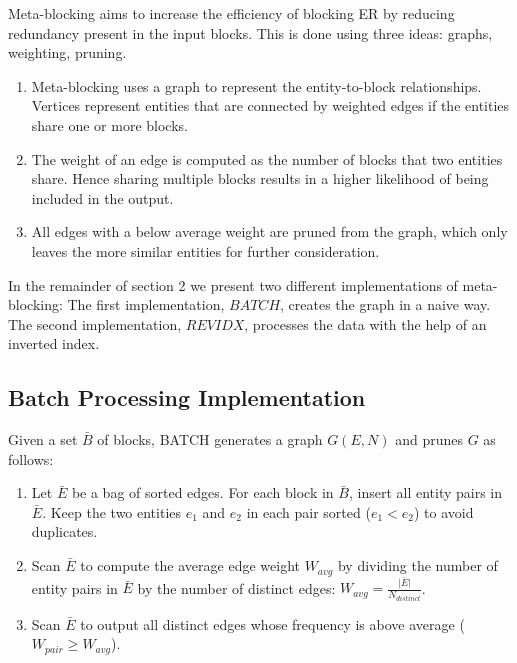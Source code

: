 \documentclass[a4paper,12pt]{article}
\begin{document}
Meta-blocking aims to increase the efficiency of blocking ER by reducing redundancy present in the input blocks. This is done using three ideas: graphs, weighting, pruning.
\begin{enumerate}
  \item Meta-blocking uses a graph to represent the entity-to-block relationships. Vertices represent entities that are connected by weighted edges if the entities share one or more blocks.
  \item The weight of an edge is computed as the number of blocks that two entities share. Hence sharing multiple blocks results in a higher likelihood of being included in the output.
  \item All edges with a below average weight are pruned from the graph, which only leaves the more similar entities for further consideration.
\end{enumerate}


In the remainder of section 2 we present two different implementations of meta-blocking: The first implementation, $BATCH$, creates the graph in a naive way. The second implementation, $REVIDX$, processes the data with the help of an inverted index.

\subsection{Batch Processing Implementation}
Given a set $\bar B$ of blocks, BATCH generates a graph $G(E, N)$ and prunes $G$ as follows:
\begin{enumerate}
  \item Let $\bar E$ be a bag of sorted edges. For each block in $\bar B$, insert all entity pairs in $\bar E$. Keep the two entities $e_{1}$ and $e_{2}$ in each pair sorted ($e_{1} < e_{2}$) to avoid duplicates.
  \item Scan $\bar E$ to compute the average edge weight $W_{avg}$ by dividing the number of entity pairs in $\bar E$ by the number of distinct edges: $W_{avg} = \frac{\lvert \bar E \rvert}{N_{distinct}}$.
  \item Scan $\bar E$ to output all distinct edges whose frequency is above average ($W_{pair} \geq W_{avg}$).
\end{enumerate}
\end{document}
